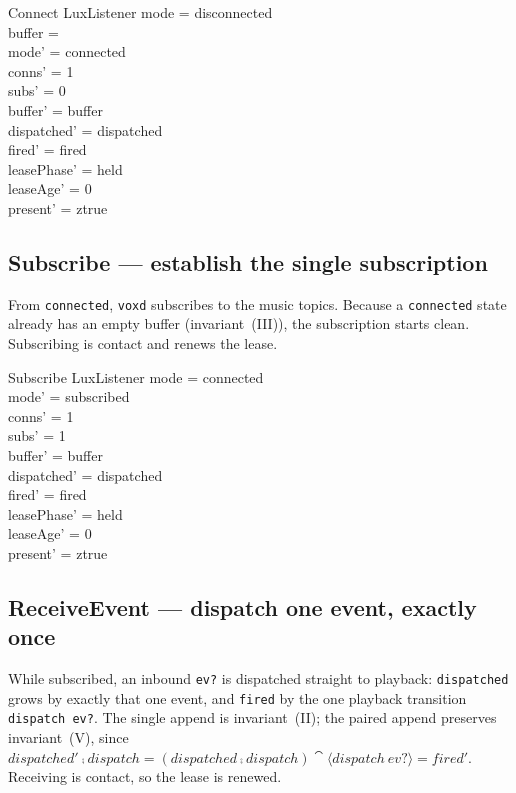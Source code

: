 \documentclass[a4paper,10pt,fleqn]{article}
\begin{document}
\begin{schema}{Connect}
  \Delta LuxListener
  \where
  mode = disconnected \\
  buffer = \langle \rangle \\
  mode' = connected \\
  conns' = 1 \\
  subs' = 0 \\
  buffer' = buffer \\
  dispatched' = dispatched \\
  fired' = fired \\
  leasePhase' = held \\
  leaseAge' = 0 \\
  present' = ztrue
\end{schema}

\subsection{Subscribe --- establish the single subscription}

From \texttt{connected}, \texttt{voxd} subscribes to the music topics. Because a
\texttt{connected} state already has an empty buffer (invariant~(III)), the
subscription starts clean. Subscribing is contact and renews the lease.

\begin{schema}{Subscribe}
  \Delta LuxListener
  \where
  mode = connected \\
  mode' = subscribed \\
  conns' = 1 \\
  subs' = 1 \\
  buffer' = buffer \\
  dispatched' = dispatched \\
  fired' = fired \\
  leasePhase' = held \\
  leaseAge' = 0 \\
  present' = ztrue
\end{schema}

\subsection{ReceiveEvent --- dispatch one event, exactly once}

While subscribed, an inbound \texttt{ev?} is dispatched straight to playback:
\texttt{dispatched} grows by exactly that one event, and \texttt{fired} by the one
playback transition \texttt{dispatch~ev?}. The single append is invariant~(II);
the paired append preserves invariant~(V), since
$dispatched' \comp dispatch = (dispatched \comp dispatch) \cat \langle
dispatch~ev? \rangle = fired'$. Receiving is contact, so the lease is renewed.
\end{document}
